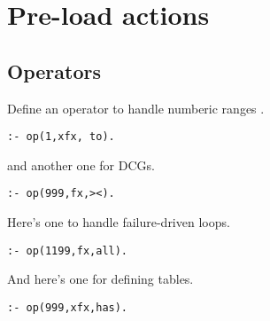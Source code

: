 \section{ Pre-load actions  
}
\subsection{ Operators 
}
Define an operator to handle numberic ranges
.
\begin{Verbatim}
:- op(1,xfx, to).
\end{Verbatim}
and another one for DCGs.
\begin{Verbatim}
:- op(999,fx,><).
\end{Verbatim}
Here's one to handle failure-driven loops.
\begin{Verbatim}
:- op(1199,fx,all).
\end{Verbatim}
And here's one for defining tables.
\begin{Verbatim}
:- op(999,xfx,has).
\end{Verbatim}
